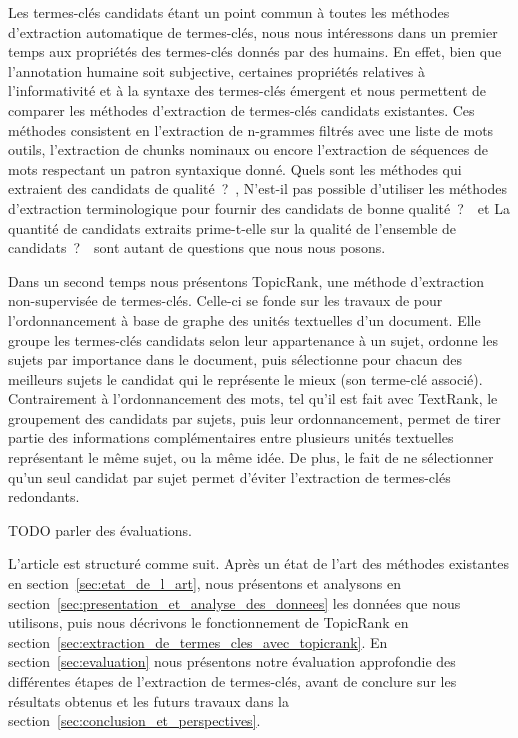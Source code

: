   Les termes-clés candidats étant un point commun à toutes les méthodes
  d'extraction automatique de termes-clés, nous nous intéressons dans un premier
  temps aux propriétés des termes-clés donnés par des humains. En effet, bien
  que l'annotation humaine soit subjective, certaines propriétés relatives à
  l'informativité et à la syntaxe des termes-clés émergent et nous permettent de
  comparer les méthodes d'extraction de termes-clés candidats existantes. Ces
  méthodes consistent en l'extraction de n-grammes filtrés avec une liste de
  mots outils, l'extraction de chunks nominaux ou encore l'extraction de
  séquences de mots respectant un patron syntaxique donné. \og Quels sont les
  méthodes qui extraient des candidats de qualité~?~\fg, \og N'est-il pas
  possible d'utiliser les méthodes d'extraction terminologique pour fournir des
  candidats de bonne qualité~?~\fg\ et \og La quantité de candidats extraits
  prime-t-elle sur la qualité de l'ensemble de candidats~?~\fg\ sont autant de
  questions que nous nous posons.

  Dans un second temps nous présentons TopicRank, une méthode d'extraction
  non-supervisée de termes-clés. Celle-ci se fonde sur les travaux de
   pour l'ordonnancement à base de
  graphe des unités textuelles d'un document. Elle groupe les termes-clés
  candidats selon leur appartenance à un sujet, ordonne les sujets par
  importance dans le document, puis sélectionne pour chacun des meilleurs sujets
  le candidat qui le représente le mieux (son terme-clé associé).
  Contrairement à l'ordonnancement des mots, tel qu'il est fait avec TextRank,
  le groupement des candidats par sujets, puis leur ordonnancement, permet de
  tirer partie des informations complémentaires entre plusieurs unités
  textuelles représentant le même sujet, ou la même idée. De plus, le fait de ne
  sélectionner qu'un seul candidat par sujet permet d'éviter l'extraction de
  termes-clés redondants.

  TODO parler des évaluations.

  L'article est structuré comme suit. Après un état de l'art des méthodes
  existantes en section~\ref{sec:etat_de_l_art}, nous présentons et analysons en
  section~\ref{sec:presentation_et_analyse_des_donnees} les données que nous
  utilisons, puis nous décrivons le fonctionnement de TopicRank en
  section~\ref{sec:extraction_de_termes_cles_avec_topicrank}. En
  section~\ref{sec:evaluation} nous présentons notre évaluation approfondie des
  différentes étapes de l'extraction de termes-clés, avant de conclure sur les
  résultats obtenus et les futurs travaux dans la
  section~\ref{sec:conclusion_et_perspectives}.

